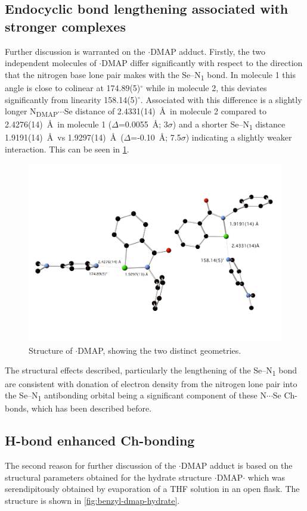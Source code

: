 \begin{refsection}
\subsection{Endocyclic bond lengthening associated with stronger complexes}
Further discussion is warranted on the $\cdot$DMAP adduct.
Firstly, the two independent molecules of $\cdot$DMAP differ significantly with respect to the direction that the nitrogen base lone pair makes with the Se--N\textsubscript{1} bond.
In molecule 1 this angle is close to colinear at 174.89(5)$^\circ$ while in molecule 2, this deviates significantly from linearity 158.14(5)$^\circ$.
Associated with this difference is a slightly longer N\textsubscript{DMAP}$\cdots$Se distance of 2.4331(14)~\AA\ in molecule 2 compared to 2.4276(14)~\AA\ in molecule 1 ($\Delta$=0.0055~\AA ; 3$\sigma$) and a shorter Se--N\textsubscript{1} distance 1.9191(14)~\AA\ vs 1.9297(14)~\AA\ ($\Delta$=-0.10~\AA ; 7.5$\sigma$) indicating a slightly weaker interaction.
This can be seen in \cref{fig:benzyl-dmap-xray-2}.

\begin{figure}
  \centering
  \includegraphics[width=0.8\linewidth]{Figures/benzyl-dmap-xray-2.pdf}
  \caption{Structure of $\cdot$DMAP, showing the two distinct geometries.}
  \label{fig:benzyl-dmap-xray-2}
\end{figure}

The structural effects described, particularly the lengthening of the Se--N\textsubscript{1} bond are consistent with donation of electron density from the nitrogen lone pair into the Se--N\textsubscript{1} antibonding orbital being a significant component of these N$\cdots$Se Ch-bonds, which has been described before\autocite{Pascoe2017}.

\subsection{H-bond enhanced Ch-bonding}
The second reason for further discussion of the $\cdot$DMAP adduct is based on the structural parameters obtained for the hydrate structure $\cdot$DMAP$\cdot$ which was serendipitously obtained by evaporation of a THF solution in an open flask.
The structure is shown in \cref{fig:benzyl-dmap-hydrate}.


\end{refsection}
